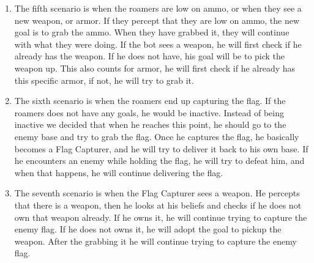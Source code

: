 \begin{enumerate}
	\item The fifth scenario is when the roamers are low on ammo, or when they see a new weapon, or armor. If they percept that they are low on ammo, the new goal is to grab the ammo. When they have grabbed it, they will continue with what they were doing. If the bot sees a weapon, he will first check if he already has the weapon. If he does not have, his goal will be to pick the weapon up. This also counts for armor, he will first check if he already has this specific armor, if not, he will try to grab it. \\
	\item The sixth scenario is when the roamers end up capturing the flag. If the roamers does not have any goals, he would be inactive. Instead of being inactive we decided that when he reaches this point, he should go to the enemy base and try to grab the flag. Once he captures the flag, he basically becomes a Flag Capturer, and he will try to deliver it back to his own base. If he encounters an enemy while holding the flag, he will try to defeat him, and when that happens, he will continue delivering the flag.\\ 
	\item The seventh scenario is when the Flag Capturer sees a weapon. He percepts that there is a weapon, then he looks at his beliefs and checks if he does not own that weapon already. If he owns it, he will continue trying to capture the enemy flag. If he does not owns it, he will adopt the goal to pickup the weapon. After the grabbing it he will continue trying to capture the enemy flag.
\end{enumerate}